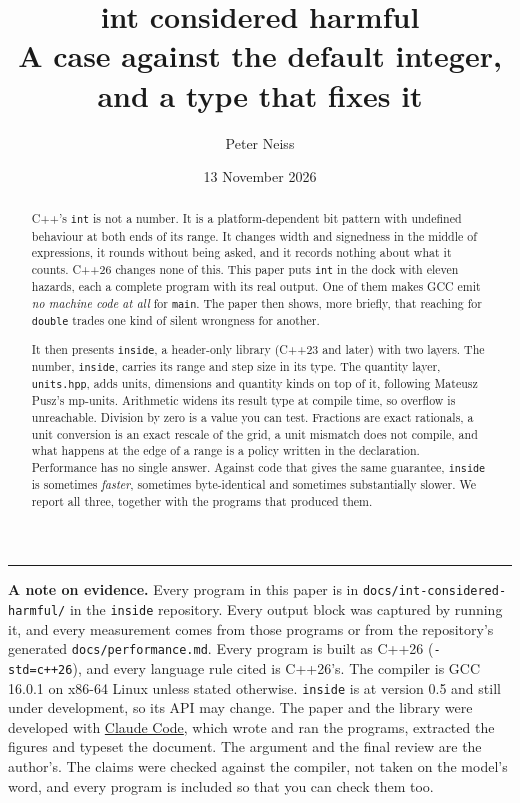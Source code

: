 \documentclass[11pt,a4paper]{article}
\title{\vspace{-1.5cm}\textbf{int considered harmful}\\[0.4em]
       \large A case against the default integer, and a type that fixes it}
\author{Peter Neiss}
\date{13 November 2026}
\newcommand{\code}[1]{\texttt{\small #1}}
\newcommand{\file}[1]{\texttt{\small #1}}
\begin{document}
\maketitle
\thispagestyle{plain}

\begin{abstract}
\noindent
C++'s \code{int} is not a number. It is a platform-dependent bit pattern with
undefined behaviour at both ends of its range. It changes width and
signedness in the middle of expressions, it rounds without being asked, and it
records nothing about what it counts. C++26 changes none of this. This paper
puts \code{int} in the dock with eleven hazards, each a complete program with its real output. One of them
makes GCC emit \emph{no machine code at all} for \code{main}. The paper then
shows, more briefly, that reaching for \code{double} trades one kind of silent
wrongness for another.

It then presents \code{inside}, a header-only library (C++23 and later) with
two layers. The number, \code{inside}, carries its range and step size in its
type. The quantity layer, \code{units.hpp}, adds units, dimensions and quantity
kinds on top of it, following Mateusz Pusz's mp-units. Arithmetic widens its
result type at compile time, so overflow is unreachable. Division by zero is a
value you can test. Fractions are exact rationals, a unit conversion is an
exact rescale of the grid, a unit mismatch does not compile, and what happens
at the edge of a range is a policy written in the declaration. Performance has
no single answer. Against code that gives the
same guarantee, \code{inside} is sometimes \emph{faster}, sometimes
byte-identical and sometimes substantially slower. We report all three,
together with the programs that produced them.
\end{abstract}

\vspace{0.5em}
\noindent\rule{\textwidth}{0.4pt}
\vspace{0.3em}

{\small
\noindent\textbf{A note on evidence.} Every program in this paper is in
\file{docs/int-considered-harmful/} in the \code{inside} repository. Every
output block was captured by running it, and every measurement comes from those
programs or from the repository's generated \file{docs/performance.md}. Every
program is built as C++26 (\code{-std=c++26}), and every language rule cited is
C++26's. The compiler is GCC 16.0.1 on \mbox{x86-64} Linux unless stated
otherwise.
\code{inside} is at version 0.5 and still under development, so its API may
change. The paper and the library were developed with
\href{https://claude.com/claude-code}{Claude Code}, which wrote and ran the
programs, extracted the figures and typeset the document. The argument and the
final review are the author's. The claims were checked against the compiler,
not taken on the model's word, and every program is included so that you can
check them too.
}
\end{document}
